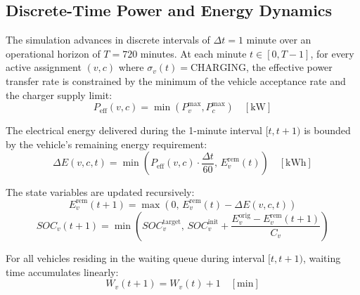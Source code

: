 \documentclass[conference]{IEEEtran}
\begin{document}
\subsection{Discrete-Time Power and Energy Dynamics}
The simulation advances in discrete intervals of $\Delta t = 1$ minute over an operational horizon of $T = 720$ minutes. At each minute $t \in [0, T-1]$, for every active assignment $(v, c)$ where $\sigma_v(t) = \text{CHARGING}$, the effective power transfer rate is constrained by the minimum of the vehicle acceptance rate and the charger supply limit:
\begin{equation}
P_{\mathrm{eff}}(v, c) = \min(P_v^{\max}, P_c^{\max}) \quad [\text{kW}]
\label{eq:p_eff}
\end{equation}

The electrical energy delivered during the 1-minute interval $[t, t+1)$ is bounded by the vehicle's remaining energy requirement:
\begin{equation}
\Delta E(v, c, t) = \min\left( P_{\mathrm{eff}}(v, c) \cdot \frac{\Delta t}{60}, \, E_v^{\mathrm{rem}}(t) \right) \quad [\text{kWh}]
\label{eq:delta_e}
\end{equation}

The state variables are updated recursively:
\begin{equation}
E_v^{\mathrm{rem}}(t+1) = \max\left(0, \, E_v^{\mathrm{rem}}(t) - \Delta E(v, c, t)\right)
\label{eq:update_e}
\end{equation}
\begin{equation}
SOC_v(t+1) = \min\left(SOC_v^{\mathrm{target}}, \, SOC_v^{\mathrm{init}} + \frac{E_v^{\mathrm{orig}} - E_v^{\mathrm{rem}}(t+1)}{C_v}\right)
\label{eq:update_soc}
\end{equation}

For all vehicles residing in the waiting queue during interval $[t, t+1)$, waiting time accumulates linearly:
\begin{equation}
W_v(t+1) = W_v(t) + 1 \quad [\text{min}]
\label{eq:update_wait}
\end{equation}
\end{document}
